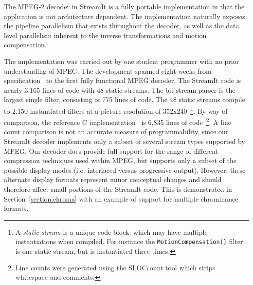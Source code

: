 The MPEG-2 decoder in StreamIt is a fully portable implementation in
that the application is not architecture dependent. The implementation
naturally exposes the pipeline parallelism that exists throughout the
decoder, as well as the data level parallelism inherent to the inverse
transformations and motion compensation.

The implementation was carried out by one student programmer with no
prior understanding of MPEG. The development spanned eight weeks from
specification~\cite{MPEG2} to the first fully functional MPEG
decoder. The StreamIt code is nearly 3,165 lines of code with 48
static streams. The bit stream parser is the largest single filter,
consisting of 775 lines of code. The 48 static streams compile to
2,150 instantiated filters at a picture resolution of 352x240~\footnote{A 
{\it static stream} is a unique code block, which may have multiple 
instantiations when compiled. For instance the \texttt{MotionCompensation()} 
filter is one static stream, but is instantiated three times.}. By way of
comparison, the reference C implementation~\cite{reference-mpeg-c} is
6,835 lines of code~\footnote{Line counts were generated using 
the SLOCcount tool which strips whitespace and comments.}.
A line count comparison is not an accurate
measure of programmability, since our StreamIt decoder 
implements only a subset of several stream types supported by MPEG.
Our decoder does provide full support for the range of different 
compression techniques used within MPEG, but supports only a subset 
of the possible display modes (i.e. interlaced versus progressive output).
However, these alternate display formats represent minor conceptual
changes and should therefore affect small portions of the StreamIt code. 
This is demonstrated in Section~\ref{section:chroma} with an example of
support for multiple chrominance formats. 

